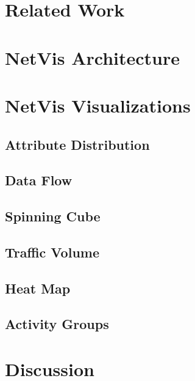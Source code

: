 \section{Related Work}


\section{NetVis Architecture}


\section{NetVis Visualizations}



\subsection{Attribute Distribution}


\subsection{Data Flow}


\subsection{Spinning Cube}


\subsection{Traffic Volume}


\subsection{Heat Map}


\subsection{Activity Groups}


\section{Discussion}


